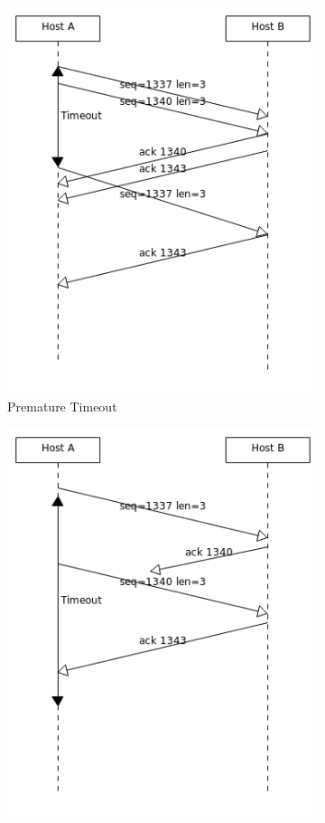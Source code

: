 \documentclass[a4paper, 11 pt, article, accentcolor=tud7b]{tudreport}
\begin{document}
\begin{figure}[h]
\begin{subfigure}[b]{0.3\textwidth}
      \includegraphics[width=\textwidth]{retrans2.png}
      \caption{Premature Timeout}
      \label{fig:2}
    \end{subfigure}
    \begin{subfigure}[b]{0.3\textwidth}
      \includegraphics[width=\textwidth]{retrans3.png}

\end{subfigure}
\end{figure}
\end{document}
